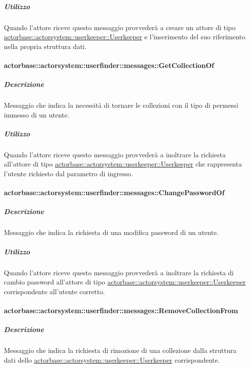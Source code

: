\documentclass{scalatekids-article}
\begin{document}
\subparagraph{Utilizzo}
Quando l'attore riceve questo messaggio provvederà a creare un attore di tipo \hyperref[sec:actorbase::actorsystem::userkeeper::Userkeeper]{actorbase::\allowbreak{}actorsystem::\allowbreak{}userkeeper::\allowbreak{}Userkeeper}
e l'inserimento del suo riferimento nella propria struttura dati.

\paragraph{actorbase::actorsystem::userfinder::messages::GetCollectionOf}
\label{sec:actorbase::actorsystem::userfinder::messages::GetCollectionOf}

\subparagraph{Descrizione}
Messaggio che indica la necessità di tornare le collezioni con il tipo di permessi immesso di un utente.

\subparagraph{Utilizzo}
Quando l'attore riceve questo messaggio provvederà a inoltrare la richiesta all'attore di tipo \hyperref[sec:actorbase::actorsystem::userkeeper::Userkeeper]{actorbase::\allowbreak{}actorsystem::\allowbreak{}userkeeper::\allowbreak{}Userkeeper}
che rappresenta l'utente richiesto dal parametro di ingresso.

\paragraph{actorbase::actorsystem::userfinder::messages::ChangePasswordOf}
\label{sec:actorbase::actorsystem::userfinder::messages::ChangePasswordOf}

\subparagraph{Descrizione}
Messaggio che indica la richiesta di una modifica password di un utente.

\subparagraph{Utilizzo}
Quando l'attore riceve questo messaggio provvederà a inoltrare la richiesta di cambio password all'attore di tipo \hyperref[sec:actorbase::actorsystem::userkeeper::Userkeeper]{actorbase::\allowbreak{}actorsystem::\allowbreak{}userkeeper::\allowbreak{}Userkeeper}
corrispondente all'utente corretto.

\paragraph{actorbase::actorsystem::userfinder::messages::RemoveCollectionFrom}
\label{sec:actorbase::actorsystem::userfinder::messages::RemoveCollectionFrom}

\subparagraph{Descrizione}
Messaggio che indica la richiesta di rimozione di una collezione dalla struttura dati dello \hyperref[sec:actorbase::actorsystem::userkeeper::Userkeeper]{actorbase::\allowbreak{}actorsystem::\allowbreak{}userkeeper::\allowbreak{}Userkeeper} corrispondente.
\end{document}
